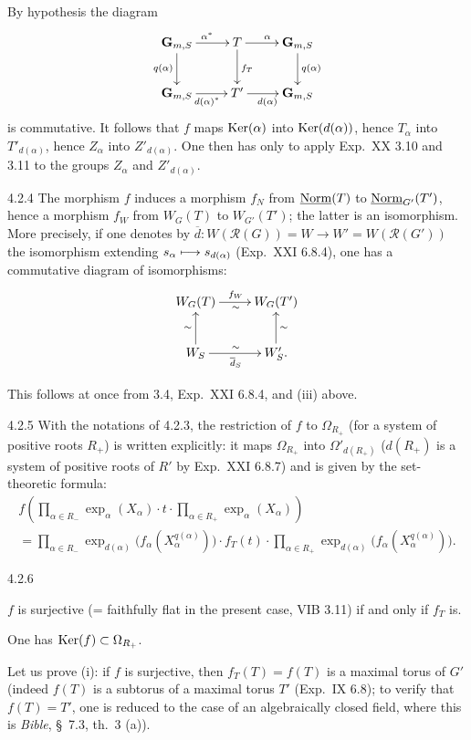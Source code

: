 By hypothesis the diagram
\[
\xymatrix{\mathbf G_{m,S}\ar[r]^{\alpha^*}\ar[d]_{q(\alpha)}&T\ar[r]^\alpha\ar[d]^{f_T}&\mathbf G_{m,S}\ar[d]^{q(\alpha)}\\
\mathbf G_{m,S}\ar[r]_{d(\alpha)^*}&T'\ar[r]_{d(\alpha)}&\mathbf G_{m,S}}
\]
is commutative. It follows that $f$ maps $\operatorname{Ker}(\alpha)$ into $\operatorname{Ker}(d(\alpha))$, hence $T_\alpha$ into $T'_{d(\alpha)}$, hence $Z_\alpha$ into $Z'_{d(\alpha)}$. One then has only to apply Exp.~XX 3.10 and 3.11 to the groups $Z_\alpha$ and $Z'_{d(\alpha)}$.
\begin{proposition}{4.2.4}\label{XXII.4.2.4}
The morphism $f$ induces a morphism $f_N$ from $\underline{\mathrm{Norm}}(T)$ to $\underline{\mathrm{Norm}}_{G'}(T')$, hence a morphism $f_W$ from $W_G(T)$ to $W_{G'}(T')$; the latter is an isomorphism. More precisely, if one denotes by $\overline d:W(\mathscr R(G))=W\to W'=W(\mathscr R(G'))$ the isomorphism extending $s_\alpha\longmapsto s_{d(\alpha)}$ (Exp.~XXI 6.8.4), one has a commutative diagram of isomorphisms:
\[
\xymatrix{W_G(T)\ar[r]^{f_W}_\sim&W_G(T')\\
W_S\ar[u]^\sim\ar[r]_{\overline d_S}^\sim&W'_S\ar[u]_\sim.}
\]
\end{proposition}
This follows at once from 3.4, Exp.~XXI 6.8.4, and (iii) above.
\begin{remark}{4.2.5}\label{XXII.4.2.5}
With the notations of 4.2.3, the restriction of $f$ to $\Omega_{R_+}$ (for a system of positive roots $R_+$) is written explicitly: it maps $\Omega_{R_+}$ into $\Omega'_{d(R_+)}$ ($d(R_+)$ is a system of positive roots of $R'$ by Exp.~XXI 6.8.7) and is given by the set-theoretic formula:
\[
\begin{gathered}
f\left(\prod_{\alpha\in R_-}\exp_\alpha(X_\alpha)\cdot t\cdot\prod_{\alpha\in R_+}\exp_\alpha(X_\alpha)\right)\\
=\prod_{\alpha\in R_-}\exp_{d(\alpha)}\bigl(f_\alpha(X_\alpha^{q(\alpha)})\bigr)\cdot f_T(t)\cdot
\prod_{\alpha\in R_+}\exp_{d(\alpha)}\bigl(f_\alpha(X_\alpha^{q(\alpha)})\bigr).
\end{gathered}
\]
\end{remark}
\begin{proposition}{4.2.6}\label{XXII.4.2.6}
\begin{enumeratei}
\item $f$ is surjective (= faithfully flat in the present case, \cf VIB 3.11) if and only if $f_T$ is.
\item One has $\operatorname{Ker}(f)\subset\Omega_{R_+}$.
\end{enumeratei}
\end{proposition}
Let us prove (i): if $f$ is surjective, then $f_T(T)=f(T)$ is a maximal torus of $G'$ (indeed $f(T)$ is a subtorus of a maximal torus $T'$ (Exp.~IX 6.8); to verify that $f(T)=T'$, one is reduced to the case of an algebraically closed field, where this is \textit{Bible}, \S~7.3, th.~3 (a)).

